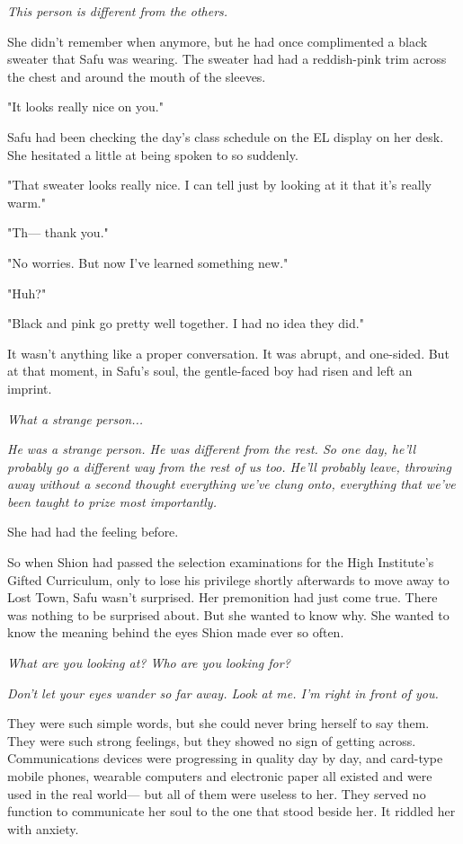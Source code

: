\emph{This person is different from the others.}

She didn't remember when anymore, but he had once complimented a black
sweater that Safu was wearing. The sweater had had a reddish-pink trim
across the chest and around the mouth of the sleeves.

"It looks really nice on you."

Safu had been checking the day's class schedule on the EL display on her
desk. She hesitated a little at being spoken to so suddenly.

"That sweater looks really nice. I can tell just by looking at it that
it's really warm."

"Th--- thank you."

"No worries. But now I've learned something new."

"Huh?"

"Black and pink go pretty well together. I had no idea they did."

It wasn't anything like a proper conversation. It was abrupt, and
one-sided. But at that moment, in Safu's soul, the gentle-faced boy had
risen and left an imprint.

\emph{What a strange person...}

\emph{He was a strange person. He was different from the rest. So one day,
he'll probably go a different way from the rest of us too. He'll
probably leave, throwing away without a second thought everything we've
clung onto, everything that we've been taught to prize most importantly.}

She had had the feeling before.

So when Shion had passed the selection examinations for the High
Institute's Gifted Curriculum, only to lose his privilege shortly
afterwards to move away to Lost Town, Safu wasn't surprised. Her
premonition had just come true. There was nothing to be surprised about.
But she wanted to know why. She wanted to know the meaning behind the
eyes Shion made ever so often.

\emph{What are you looking at? Who are you looking for?}

\emph{Don't let your eyes wander so far away. Look at me. I'm right in front
of you.}

They were such simple words, but she could never bring herself to say
them. They were such strong feelings, but they showed no sign of getting
across. Communications devices were progressing in quality day by day,
and card-type mobile phones, wearable computers and electronic paper all
existed and were used in the real world--- but all of them were useless to
her. They served no function to communicate her soul to the one that
stood beside her. It riddled her with anxiety.

